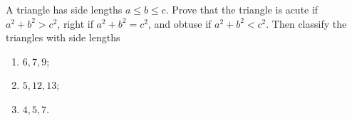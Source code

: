 A triangle has side lengths $a\le b\le c$. Prove that the triangle is acute if $a^2+b^2>c^2$, right if $a^2+b^2=c^2$, and obtuse if $a^2+b^2<c^2$. Then classify the triangles with side lengths
\begin{enumerate}
\item[(a)] $6,7,9$;
\item[(b)] $5,12,13$;
\item[(c)] $4,5,7$.
\end{enumerate}
